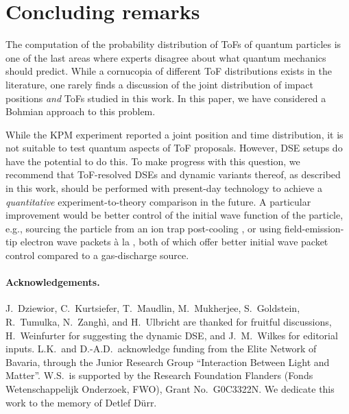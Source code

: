 \documentclass[11pt,a4paper]{article}
\begin{document}
\section{Concluding remarks}
The computation of the probability distribution of ToFs of quantum particles is one of the last areas where experts disagree about what quantum mechanics should predict. While a cornucopia of different ToF distributions exists in the literature, one rarely finds a discussion of the joint distribution of impact positions \emph{and} ToFs studied in this work. In this paper, we have considered a Bohmian approach to this problem. 

While the KPM experiment reported a joint position and time distribution, it is not suitable to test quantum aspects of ToF proposals. However, DSE setups do have the potential to do this. To make progress with this question, we recommend that ToF-resolved DSEs and dynamic variants thereof, as described in this work, should be performed with present-day technology to achieve a \emph{quantitative} experiment-to-theory comparison in the future. A particular improvement would be better control of the initial wave function of the particle, e.g., sourcing the particle from an ion trap post-cooling \cite{FHF}, or using field-emission-tip electron wave packets \`a la \cite{HHBB}, both of which offer better initial wave packet control compared to a gas-discharge source.

\paragraph{Acknowledgements.} J.\ Dziewior, C.\ Kurtsiefer, T.\ Maudlin, M.\ Mukherjee, S.\ Goldstein, R.\ Tumulka, N.\ Zangh\`i, and H.\ Ulbricht are thanked for fruitful discussions, H.\ Weinfurter for suggesting the dynamic DSE, and J.\ M.\ Wilkes for editorial inputs. L.K.\ and D.-A.D.\ acknowledge funding from the Elite Network of Bavaria, through the Junior Research Group ``Interaction Between Light and Matter''. W.S.\ is supported by the Research Foundation Flanders (Fonds Wetenschappelijk Onderzoek, FWO), Grant No.\ G0C3322N. We dedicate this work to the memory of Detlef D\"urr.

\printbibliography
%
%
\end{document}
